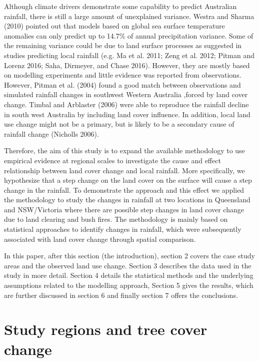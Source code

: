 \documentclass[]{elsarticle} %
\theoremstyle{definition}
\theoremstyle{definition}
\theoremstyle{definition}
\theoremstyle{remark}
\begin{document}
Although climate drivers demonstrate some capability to predict
Australian rainfall, there is still a large amount of unexplained
variance. Westra and Sharma (2010) pointed out that models based on
global sea surface temperature anomalies can only predict up to 14.7\%
of annual precipitation variance. Some of the remaining variance could
be due to land surface processes as suggested in studies predicting
local rainfall (e.g. Ma et al. 2011; Zeng et al. 2012; Pitman and Lorenz
2016; Saha, Dirmeyer, and Chase 2016). However, they are mostly based on
modelling experiments and little evidence was reported from
observations. However, Pitman et al. (2004) found a good match between
observations and simulated rainfall changes in southwest Western
Australia ,forced by land cover change. Timbal and Arblaster (2006) were
able to reproduce the rainfall decline in south west Australia by
including land cover influence. In addition, local land use change might
not be a primary, but is likely to be a secondary cause of rainfall
change (Nicholls 2006).

Therefore, the aim of this study is to expand the available methodology
to use empirical evidence at regional scales to investigate the cause
and effect relationship between land cover change and local rainfall.
More specifically, we hypothesize that a step change on the land cover
on the surface will cause a step change in the rainfall. To demonstrate
the approach and this effect we applied the methodology to study the
changes in rainfall at two locations in Queensland and NSW/Victoria
where there are possible step changes in land cover change due to land
clearing and bush fires. The methodology is mainly based on statistical
approaches to identify changes in rainfall, which were subsequently
associated with land cover change through spatial comparison.

In this paper, after this section (the introduction), section 2 covers
the case study areas and the observed land use change. Section 3
describes the data used in the study in more detail. Section 4 details
the statistical methods and the underlying assumptions related to the
modelling approach, Section 5 gives the results, which are further
discussed in section 6 and finally section 7 offers the conclusions.

\section{Study regions and tree cover
change}\label{study-regions-and-tree-cover-change}
\end{document}
